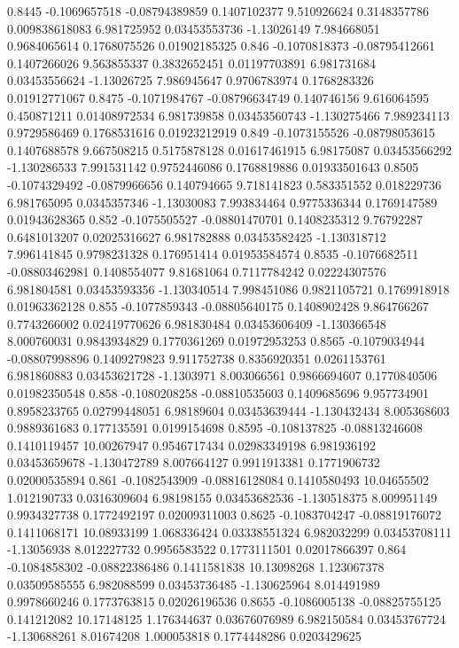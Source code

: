 {0.8445 -0.1069657518 -0.08794389859 0.1407102377 9.510926624 0.3148357786 0.009838618083 6.981725952 0.03453553736 -1.13026149 7.984668051 0.9684065614 0.1768075526 0.01902185325
0.846 -0.1070818373 -0.08795412661 0.1407266026 9.563855337 0.3832652451 0.01197703891 6.981731684 0.03453556624 -1.13026725 7.986945647 0.9706783974 0.1768283326 0.01912771067
0.8475 -0.1071984767 -0.08796634749 0.140746156 9.616064595 0.450871211 0.01408972534 6.981739858 0.03453560743 -1.130275466 7.989234113 0.9729586469 0.1768531616 0.01923212919
0.849 -0.1073155526 -0.08798053615 0.1407688578 9.667508215 0.5175878128 0.01617461915 6.98175087 0.03453566292 -1.130286533 7.991531142 0.9752446086 0.1768819886 0.01933501643
0.8505 -0.1074329492 -0.0879966656 0.140794665 9.718141823 0.583351552 0.018229736 6.981765095 0.0345357346 -1.13030083 7.993834464 0.9775336344 0.1769147589 0.01943628365
0.852 -0.1075505527 -0.08801470701 0.1408235312 9.76792287 0.6481013207 0.02025316627 6.981782888 0.03453582425 -1.130318712 7.996141845 0.9798231328 0.176951414 0.01953584574
0.8535 -0.1076682511 -0.08803462981 0.1408554077 9.81681064 0.7117784242 0.02224307576 6.981804581 0.03453593356 -1.130340514 7.998451086 0.9821105721 0.1769918918 0.01963362128
0.855 -0.1077859343 -0.08805640175 0.1408902428 9.864766267 0.7743266002 0.02419770626 6.981830484 0.03453606409 -1.130366548 8.000760031 0.9843934829 0.1770361269 0.01972953253
0.8565 -0.1079034944 -0.08807998896 0.1409279823 9.911752738 0.8356920351 0.0261153761 6.981860883 0.03453621728 -1.1303971 8.003066561 0.9866694607 0.1770840506 0.01982350548
0.858 -0.1080208258 -0.08810535603 0.1409685696 9.957734901 0.8958233765 0.02799448051 6.98189604 0.03453639444 -1.130432434 8.005368603 0.9889361683 0.177135591 0.0199154698
0.8595 -0.108137825 -0.08813246608 0.1410119457 10.00267947 0.9546717434 0.02983349198 6.981936192 0.03453659678 -1.130472789 8.007664127 0.9911913381 0.1771906732 0.02000535894
0.861 -0.1082543909 -0.08816128084 0.1410580493 10.04655502 1.012190733 0.0316309604 6.98198155 0.03453682536 -1.130518375 8.009951149 0.9934327738 0.1772492197 0.02009311003
0.8625 -0.1083704247 -0.08819176072 0.1411068171 10.08933199 1.068336424 0.03338551324 6.982032299 0.03453708111 -1.13056938 8.012227732 0.9956583522 0.1773111501 0.02017866397
0.864 -0.1084858302 -0.08822386486 0.1411581838 10.13098268 1.123067378 0.03509585555 6.982088599 0.03453736485 -1.130625964 8.014491989 0.9978660246 0.1773763815 0.02026196536
0.8655 -0.1086005138 -0.08825755125 0.141212082 10.17148125 1.176344637 0.03676076989 6.982150584 0.03453767724 -1.130688261 8.01674208 1.000053818 0.1774448286 0.0203429625
}
